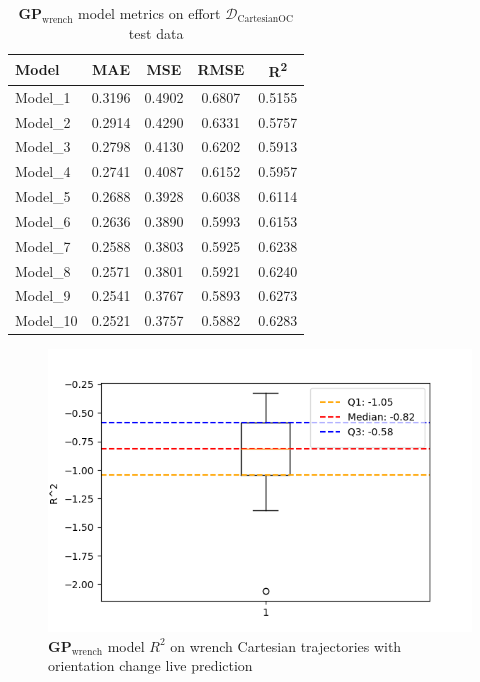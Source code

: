     \begin{table}[H]
    \centering
    \begin{tabular}{lcccc}
    \toprule
    \textbf{Model} & \textbf{MAE} & \textbf{MSE} & \textbf{RMSE} & \textbf{R\textsuperscript{2}} \\
    \midrule
    Model\_1 & 0.3196 & 0.4902 & 0.6807 & 0.5155 \\
    Model\_2 & 0.2914 & 0.4290 & 0.6331 & 0.5757 \\
    Model\_3 & 0.2798 & 0.4130 & 0.6202 & 0.5913 \\
    Model\_4 & 0.2741 & 0.4087 & 0.6152 & 0.5957 \\
    Model\_5 & 0.2688 & 0.3928 & 0.6038 & 0.6114 \\
    Model\_6 & 0.2636 & 0.3890 & 0.5993 & 0.6153 \\
    Model\_7 & 0.2588 & 0.3803 & 0.5925 & 0.6238 \\
    Model\_8 & 0.2571 & 0.3801 & 0.5921 & 0.6240 \\
    Model\_9 & 0.2541 & 0.3767 & 0.5893 & 0.6273 \\
    Model\_10 & 0.2521 & 0.3757 & 0.5882 & 0.6283 \\
    \bottomrule
    \end{tabular}
    \caption{\(\boldsymbol{GP}_{\text{wrench}}\) model metrics on effort \(\mathcal{D}_{\text{CartesianOC}}\) test data}
    \end{table}

    \begin{figure}[H]
    \centering
    \includegraphics[width=1\columnwidth]{Images/05_results/wrench_boxplot_live_OC_R^2.png}
    \caption[\(\boldsymbol{GP}_{\text{wrench}}\) model \(R^2\) on wrench Cartesian trajectories with orientation change live prediction]{\(\boldsymbol{GP}_{\text{wrench}}\) model \(R^2\) on wrench Cartesian trajectories with orientation change live prediction}
    \label{fig:wrench_oc_R^2_live}
    \end{figure}

